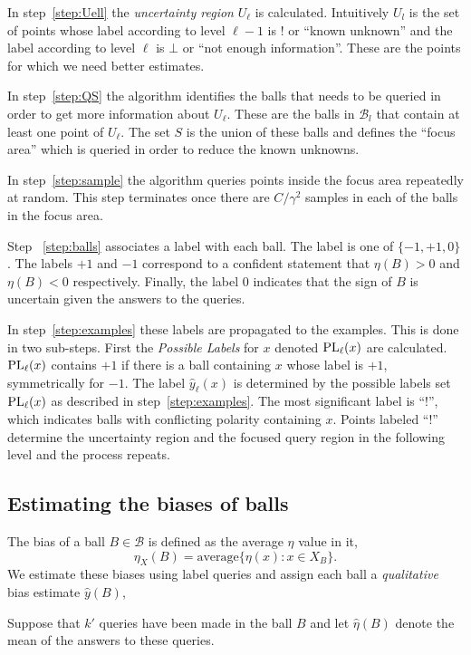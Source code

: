 \documentclass[twoside]{article}
\def\B{{\mathcal B}}
\def\yh{{\widehat{y}}}
\def\PL{{\mbox{\rm PL}}}
\begin{document}
In step~\ref{step:Uell} the {\em uncertainty region} $U_\ell$ is
calculated. Intuitively $U_l$ is the set of points whose label
according to level $\ell-1$ is ! or ``known unknown'' and the label
according to level $\ell$ is $\bot$ or ``not enough information''.
These are the points for which we need better estimates.

In step~\ref{step:QS} the algorithm identifies the balls that needs to
be queried in order to get more information about $U_\ell$. These are
the balls in $\B_l$ that contain at least one point of $U_\ell$.  The
set $S$ is the union of these balls and defines the ``focus area''
which is queried in order to reduce the known unknowns.

In step~\ref{step:sample} the algorithm queries points inside the
focus area repeatedly at random.  This step terminates once there are
$C/\gamma^2$ samples in each of the balls in the focus area.

Step ~\ref{step:balls} associates a label with each ball. The
label is one of $\{-1,+1,0\}$.  The labels $+1$ and $-1$ correspond to
a confident statement that $\eta(B)>0$ and $\eta(B)<0$
respectively. Finally, the label $0$ indicates that the sign of $B$
is uncertain given the answers to the queries.

In step~\ref{step:examples} these labels are propagated to the
examples.  This is done in two sub-steps. First the {\em Possible
  Labels} for $x$ denoted $\PL_\ell(x)$ are calculated. $\PL_\ell(x)$
contains $+1$ if there is a ball containing $x$ whose label is $+1$,
symmetrically for $-1$. The label $\yh_\ell(x)$ is determined by the
possible labels set $\PL_\ell(x)$ as described in
step~\ref{step:examples}. The most significant label is ``!'', which
indicates balls with conflicting polarity containing $x$. Points
labeled ``!'' determine the uncertainty region and the focused query
region in the following level and the process repeats.

\iffalse
  \subsection{Estimating the biases of balls}

The bias of a ball $B \in \B$ is defined as the average $\eta$ value in it,
$$ \eta_X(B) = \mbox{average}\{\eta(x): x \in X_B \} .$$
We estimate these biases using label queries and assign each ball a
\emph{qualitative} bias estimate $\yh(B)$,

Suppose that $k'$ queries have been made in the ball $B$ and let
$\widehat{\eta}(B)$ denote the mean of the answers to these queries.
\end{document}
